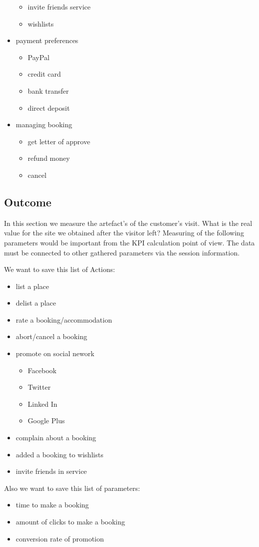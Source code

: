 \begin{itemize}
\begin{itemize}
\begin{itemize}
\end{itemize}
\item invite friends service
\item wishlists
\end{itemize}
\item payment preferences
\begin{itemize}
\item PayPal
\item credit card
\item bank transfer
\item direct deposit
\end{itemize}
\item managing booking
\begin{itemize}
\item get letter of approve
\item refund money
\item cancel
\end{itemize}
\end{itemize}

\subsection{Outcome}
In this section we measure  the artefact's of the customer's visit. What is the real value for the site we obtained after the visitor left? Measuring of the following parameters would be important from the KPI calculation point of view. The data must be connected to other gathered parameters via the session information.

We want to save this list of Actions:
\begin{itemize}
\item list a place
\item delist a place
\item rate a booking/accommodation
\item abort/cancel a booking
\item promote on social nework
\begin{itemize}
\item Facebook
\item Twitter 
\item Linked In
\item Google Plus
\end{itemize}
\item complain about a booking
\item added a booking to wishlists
\item invite friends in service
\end{itemize}
Also we want to save this list of parameters:
\begin{itemize}
\item time to make a booking
\item amount of clicks to make a booking
\item conversion rate of promotion 
\end{itemize}



